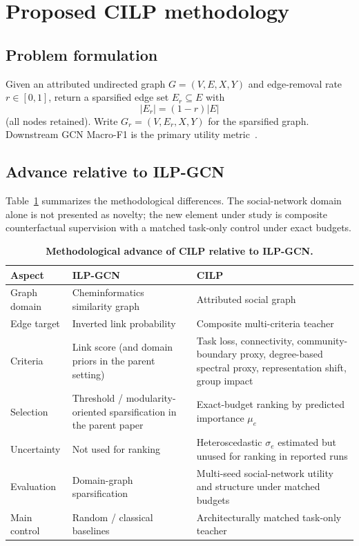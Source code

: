 \section{Proposed CILP methodology}
\label{sec:methods}

\subsection{Problem formulation}
Given an attributed undirected graph $G=(V,E,X,Y)$ and edge-removal rate $r\in[0,1]$, return a sparsified edge set $E_r\subseteq E$ with
\[
|E_r|=(1-r)|E|
\]
(all nodes retained). Write $G_r=(V,E_r,X,Y)$ for the sparsified graph.
Downstream GCN Macro-F1 is the primary utility metric~\citep{kipf2017semi}.

\subsection{Advance relative to ILP-GCN}
Table~\ref{tab:advance} summarizes the methodological differences.
The social-network domain alone is not presented as novelty; the new element under study is composite counterfactual supervision with a matched task-only control under exact budgets.

\begin{table}[t]
\centering
\caption{\textbf{Methodological advance of CILP relative to ILP-GCN.}}
\label{tab:advance}
\scriptsize
\begin{tabular}{@{}p{2.2cm}p{5.3cm}p{5.8cm}@{}}
\toprule
Aspect & ILP-GCN~\citep{bangian2025ilp} & CILP \\
\midrule
Graph domain & Cheminformatics similarity graph & Attributed social graph \\
Edge target & Inverted link probability & Composite multi-criteria teacher \\
Criteria & Link score (and domain priors in the parent setting) & Task loss, connectivity, community-boundary proxy, degree-based spectral proxy, representation shift, group impact \\
Selection & Threshold / modularity-oriented sparsification in the parent paper & Exact-budget ranking by predicted importance $\mu_e$ \\
Uncertainty & Not used for ranking & Heteroscedastic $\sigma_e$ estimated but unused for ranking in reported runs \\
Evaluation & Domain-graph sparsification & Multi-seed social-network utility and structure under matched budgets \\
Main control & Random / classical baselines & Architecturally matched task-only teacher \\
\bottomrule
\end{tabular}
\end{table}

